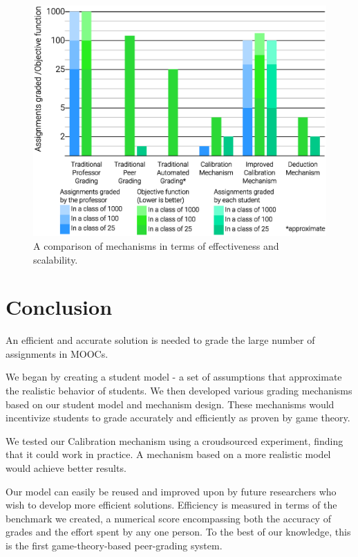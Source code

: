\documentclass{sigchi}
\begin{document}
\begin{figure}[!h]
\centering
\includegraphics[width=0.9\columnwidth]{Comparison-Graph.eps}
\caption{A comparison of mechanisms in terms of effectiveness and scalability.}
\label{fig:comparison}
\end{figure}





\section{Conclusion}
An efficient and accurate solution is needed to grade the large number of assignments in MOOCs.

We began by creating a student model - a set of assumptions that approximate the realistic behavior of students. We then developed various grading mechanisms based on our student model and mechanism design. These mechanisms would incentivize students to grade accurately and efficiently as proven by game theory.

We tested our Calibration mechanism using a croudsourced experiment, finding that it could work in practice. A mechanism based on a more realistic model would achieve better results.

Our model can easily be reused and improved upon by future researchers who wish to develop more efficient solutions. Efficiency is measured in terms of the benchmark we created, a numerical score encompassing both the accuracy of grades and the effort spent by any one person. To the best of our knowledge, this is the first game-theory-based peer-grading system.
\end{document}
